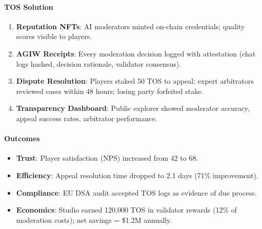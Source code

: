 \documentclass[11pt]{article}
\begin{document}
\paragraph{TOS Solution}
\begin{enumerate}[noitemsep]
  \item \textbf{Reputation NFTs}: AI moderators minted on-chain credentials; quality scores visible to players.
  \item \textbf{AGIW Receipts}: Every moderation decision logged with attestation (chat logs hashed, decision rationale, validator consensus).
  \item \textbf{Dispute Resolution}: Players staked 50 TOS to appeal; expert arbitrators reviewed cases within 48 hours; losing party forfeited stake.
  \item \textbf{Transparency Dashboard}: Public explorer showed moderator accuracy, appeal success rates, arbitrator performance.
\end{enumerate}

\paragraph{Outcomes}
\begin{itemize}[noitemsep]
  \item \textbf{Trust}: Player satisfaction (NPS) increased from 42 to 68.
  \item \textbf{Efficiency}: Appeal resolution time dropped to 2.1 days (71\% improvement).
  \item \textbf{Compliance}: EU DSA audit accepted TOS logs as evidence of due process.
  \item \textbf{Economics}: Studio earned 120,000 TOS in validator rewards (12\% of moderation costs); net savings = \$1.2M annually.
\end{itemize}
\end{document}
